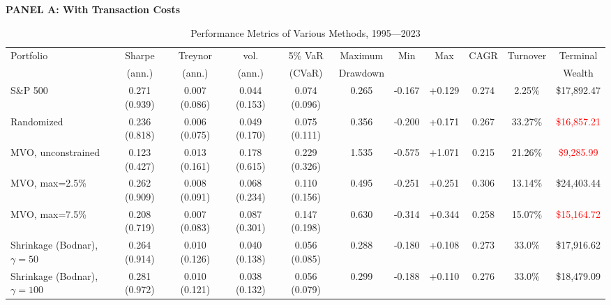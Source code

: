 \documentclass[12pt,letterpaper]{article}
\begin{document}
\newpage



\clearpage %
\begin{landscape}
\begin{table}[ht]
\renewcommand{\arraystretch}{1.5}
\centering
\caption{Performance Metrics of Various Methods, 1995---2023}
\label{tab:performance_metrics_table}
{\footnotesize

\textbf{PANEL A: With Transaction Costs} \\

\begin{tabular}{lcccccccccc}
\toprule
Portfolio  & Sharpe & Treynor & vol. & 5\% VaR & Maximum & Min & Max & CAGR & Turnover & Terminal \\
        & (ann.) & (ann.) & (ann.) & (CVaR) & Drawdown & & & & & Wealth \\
\midrule

S\&P 500 
& 0.271 (0.939) 
& 0.007 (0.086) 
& 0.044 (0.153)
& 0.074 (0.096) 
& 0.265 
& -0.167
& +0.129
& 0.274
& 2.25\%
& \$17,892.47 \\

Randomized
& 0.236 (0.818) 
& 0.006 (0.075) 
& 0.049 (0.170) 
& 0.075 (0.111) 
& 0.356
& -0.200
& +0.171
& 0.267
& 33.27\%
& \textcolor{red}{\$16,857.21} \\

MVO, unconstrained
& 0.123 (0.427) 
& 0.013 (0.161) 
& 0.178 (0.615) 
& 0.229 (0.326) 
& 1.535
& -0.575
& +1.071
& 0.215
& 21.26\%
& \textcolor{red}{\$9,285.99} \\

MVO, max=2.5\%
& 0.262 (0.909) 
& 0.008 (0.091) 
& 0.068 (0.234) 
& 0.110 (0.156) 
& 0.495
& -0.251
& +0.251
& 0.306
& 13.14\%
& \textcolor{mygreen}{\$24,403.44} \\

MVO, max=7.5\%
& 0.208 (0.719) 
& 0.007 (0.083) 
& 0.087 (0.301) 
& 0.147 (0.198) 
& 0.630
& -0.314
& +0.344
& 0.258
& 15.07\%
& \textcolor{red}{\$15,164.72} \\

Shrinkage (Bodnar), $\gamma=50$
& 0.264 (0.914) 
& 0.010 (0.126) 
& 0.040 (0.138) 
& 0.056 (0.085) 
& 0.288
& -0.180
& +0.108
& 0.273
& 33.0\%
& \textcolor{mygreen}{\$17,916.62} \\

Shrinkage (Bodnar), $\gamma=100$
& 0.281 (0.972) 
& 0.010 (0.121) 
& 0.038 (0.132) 
& 0.056 (0.079) 
& 0.299
& -0.188
& +0.110
&  0.276
& 33.0\%
& \textcolor{mygreen}{\$18,479.09} \\


\end{tabular}}
\end{table}
\end{landscape}
\end{document}
